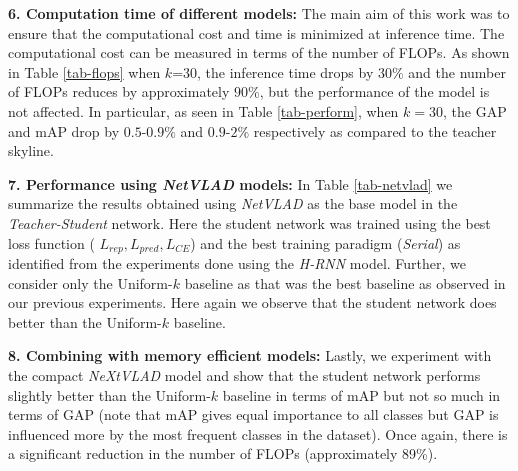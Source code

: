 \documentclass[10pt,twocolumn,letterpaper]{article}
\newcommand{\uni}[1]{Uniform-$#1$}
\begin{document}
\noindent\textbf{6. Computation time of different models:} 
The main aim of this work was to ensure that the computational cost and time is minimized at inference time. The computational cost can be measured in terms of the number of FLOPs. As shown in Table \ref{tab-flops} when $k$=30, the inference time drops by $30\%$ and the number of FLOPs reduces by approximately $90\%$, but the performance of the model is not affected. In particular, as seen in Table \ref{tab-perform}, when $k=30$, the GAP and mAP drop by $0.5$-$0.9\%$ and $0.9$-$2\%$ respectively as compared to the teacher skyline. 

\noindent\textbf{7. Performance using \textit{NetVLAD} models:} 
In Table \ref{tab-netvlad} we summarize the results obtained using \textit{NetVLAD} as the base model in the \textit{Teacher-Student} network. Here the student network was trained using the best loss function ( $L_{rep},L_{pred},L_{CE}$) and the best training paradigm (\textit{Serial}) as identified from the experiments done using the \textit{H-RNN} model. Further, we consider only the \uni{k} baseline as that was the best baseline as observed in our previous experiments. Here again we observe that the student network does better than the \uni{k} baseline. 

\noindent\textbf{8. Combining with memory efficient models:} 
Lastly, we experiment with the compact \textit{NeXtVLAD} model and show that the student network performs slightly better than the \uni{k} baseline in terms of mAP but not so much in terms of GAP (note that mAP gives equal importance to all classes but GAP is influenced more by the most frequent classes in the dataset). Once again, there is a significant reduction in the number of FLOPs (approximately 89\%). 

\begin{comment}
\begin{figure*}[b]
\centering
\texttt{[image: latex/diagrams/model.png]}
\caption{\label{diagram2} Architecture of \textsc{Teacher-Student} network for video classification}
\end{figure*}
\end{comment}
\end{document}
